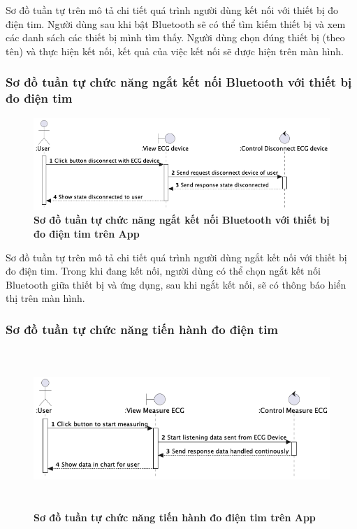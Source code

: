   Sơ đồ tuần tự trên mô tả chi tiết quá trình người dùng kết nối với thiết bị đo điện tim. Người dùng sau khi bật Bluetooth
  sẽ có thể tìm kiếm thiết bị và xem các danh sách các thiết bị mình tìm thấy. Người dùng chọn đúng thiết bị (theo tên) 
  và thực hiện kết nối, kết quả của việc kết nối sẽ được hiện trên màn hình.

\subsubsection{Sơ đồ tuần tự chức năng ngắt kết nối Bluetooth với thiết bị đo điện tim}

  \begin{figure}[H]
        \centering
        \includegraphics[width=12cm,height=3.5cm]{Images/mobile_app/disconnect_with_device.png}
        \caption[Sơ đồ tuần tự chức năng ngắt kết nối Bluetooth với thiết bị đo điện tim trên App]{\bfseries \fontsize{12pt}{0pt}
        \selectfont Sơ đồ tuần tự chức năng ngắt kết nối Bluetooth với thiết bị đo điện tim trên App}
        \label{disconnect_with_device} %
  \end{figure}

  Sơ đồ tuần tự trên mô tả chi tiết quá trình người dùng ngắt kết nối với thiết bị đo điện tim. Trong khi đang kết nối, người dùng
  có thể chọn ngắt kết nối Bluetooth giữa thiết bị và ứng dụng, sau khi ngắt kết nối, sẽ có thông báo
  hiển thị trên màn hình.

\subsubsection{Sơ đồ tuần tự chức năng tiến hành đo điện tim}

  \begin{figure}[H]
        \centering
        \includegraphics[width=12cm,height=6cm]{Images/mobile_app/start_measuring_ecg.png}
        \caption[Sơ đồ tuần tự chức năng tiến hành đo điện tim trên App]{\bfseries \fontsize{12pt}{0pt}
        \selectfont Sơ đồ tuần tự chức năng tiến hành đo điện tim trên App}
        \label{start_measuring_ecg} %
  \end{figure}
 
